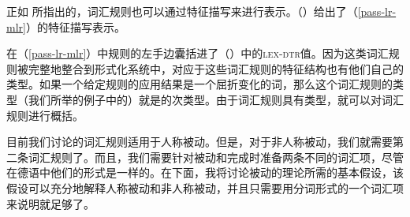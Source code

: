 正如 \citet{Meurers2001a}所指出的，词汇规则也可以通过特征描写来进行表示。\label{pageref-lr-mit-dtr}（）给出了（\ref{pass-lr-mlr}）的特征描写表示。
\begin{figure}
\ea
\label{passiv-lr-mit-dtr}
\z
\vspace{-\baselineskip}
\end{figure}%
在（\ref{pass-lr-mlr}）中规则的左手边囊括进了（）中的\textsc{lex-dtr}值。因为这类词汇规则被完整地整合到形式化系统中，对应于这些词汇规则的特征结构也有他们自己的类型。如果一个给定规则的应用结果是一个屈折变化的词，那么这个词汇规则的类型（我们所举的例子中的）就是的次类型。由于词汇规则具有类型，就可以对词汇规则进行概括。

目前我们讨论的词汇规则适用于人称被动。但是，对于非人称被动，我们就需要第二条词汇规则了。而且，我们需要针对被动和完成时准备两条不同的词汇项，尽管在德语中他们的形式是一样的。在下面，我将讨论被动的理论所需的基本假设，该假设可以充分地解释人称被动和非人称被动，并且只需要用分词形式的一个词汇项来说明就足够了。


